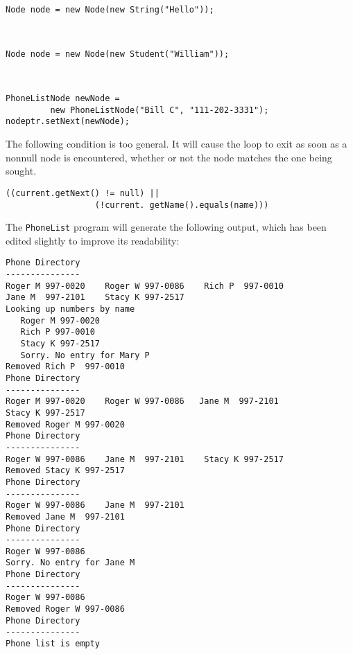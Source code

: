 \begin{ANS}
\item  \mbox{ }

\begin{jjjlisting}
\begin{lstlisting}
Node node = new Node(new String("Hello"));
\end{lstlisting}
\end{jjjlisting}


\item  \mbox{ }

\begin{jjjlisting}
\begin{lstlisting}
Node node = new Node(new Student("William"));
\end{lstlisting}
\end{jjjlisting}

\item  \mbox{ }

\begin{jjjlisting}
\begin{lstlisting}
PhoneListNode newNode = 
         new PhoneListNode("Bill C", "111-202-3331");
nodeptr.setNext(newNode);
\end{lstlisting}
\end{jjjlisting}

\item  The following condition is too general.  It will cause the 
loop to exit as soon
as a nonnull node is encountered, whether or not the node matches the
one being sought.

\begin{jjjlisting}
\begin{lstlisting}
((current.getNext() != null) || 
                  (!current. getName().equals(name)))
\end{lstlisting}
\end{jjjlisting}

\item  The {\tt PhoneList} program will generate the
following output, which has been edited slightly
to improve its readability:

\begin{jjjlisting}
\begin{lstlisting}
Phone Directory
---------------
Roger M 997-0020    Roger W 997-0086    Rich P  997-0010
Jane M  997-2101    Stacy K 997-2517
Looking up numbers by name
   Roger M 997-0020
   Rich P 997-0010
   Stacy K 997-2517
   Sorry. No entry for Mary P
Removed Rich P  997-0010
Phone Directory
---------------
Roger M 997-0020    Roger W 997-0086   Jane M  997-2101
Stacy K 997-2517
Removed Roger M 997-0020
Phone Directory
---------------
Roger W 997-0086    Jane M  997-2101    Stacy K 997-2517
Removed Stacy K 997-2517
Phone Directory
---------------
Roger W 997-0086    Jane M  997-2101
Removed Jane M  997-2101
Phone Directory
---------------
Roger W 997-0086
Sorry. No entry for Jane M
Phone Directory
---------------
Roger W 997-0086
Removed Roger W 997-0086
Phone Directory
---------------
Phone list is empty
\end{lstlisting}
\end{jjjlisting}


\end{ANS}

